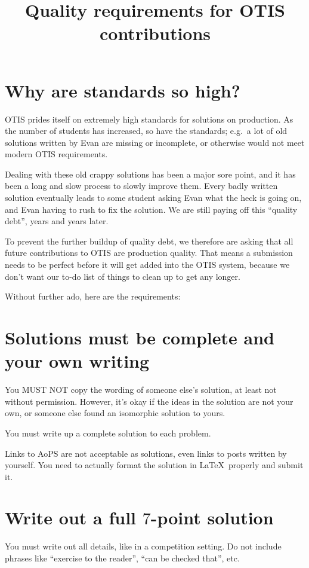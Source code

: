 \documentclass[11pt]{scrartcl}
\begin{document}
\title{Quality requirements for OTIS contributions}
\maketitle

\section*{Why are standards so high?}
OTIS prides itself on extremely high standards for solutions on production.
As the number of students has increased, so have the standards;
e.g.\ a lot of old solutions written by Evan are missing or incomplete,
or otherwise would not meet modern OTIS requirements.

Dealing with these old crappy solutions has been a major sore point,
and it has been a long and slow process to slowly improve them.
Every badly written solution eventually leads to some student asking Evan
what the heck is going on, and Evan having to rush to fix the solution.
We are still paying off this ``quality debt'', years and years later.

To prevent the further buildup of quality debt, we therefore are asking that
\alert{all future contributions to OTIS are production quality}.
That means a submission needs to be perfect before
it will get added into the OTIS system,
because we don't want our to-do list of things to clean up to get any longer.

Without further ado, here are the requirements:

\tableofcontents

\newpage

\section{Solutions must be complete and your own writing}
\alert{You MUST NOT copy the wording of someone else's solution},
at least not without permission.
However, it's okay if the ideas in the solution are not your own,
or someone else found an isomorphic solution to yours.

You \alert{must write up a complete solution} to each problem.

\alert{Links to AoPS are not acceptable as solutions},
even links to posts written by yourself.
You need to actually format the solution in \LaTeX\ properly and submit it.

\section{Write out a full $7$-point solution}
You must \alert{write out all details, like in a competition setting}.
Do not include phrases like ``exercise to the reader'',
``can be checked that'', etc.
\end{document}
